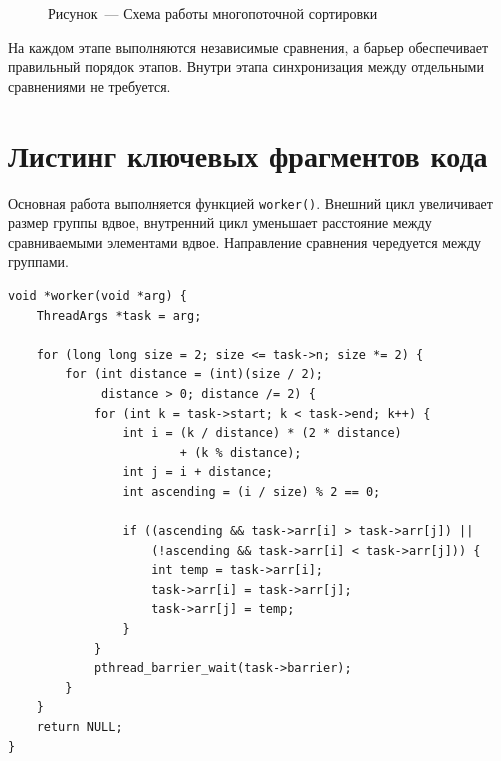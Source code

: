 \documentclass[12pt,a4paper]{article}
\begin{document}
\begin{figure}[H]
\centering
{}
\caption*{Рисунок~--- Схема работы многопоточной сортировки}
\end{figure}

На каждом этапе выполняются независимые сравнения, а барьер обеспечивает правильный порядок этапов. Внутри этапа синхронизация между отдельными сравнениями не требуется.

\Needspace{0.55\textheight}
\section{Листинг ключевых фрагментов кода}
Основная работа выполняется функцией \texttt{worker()}. Внешний цикл увеличивает размер группы вдвое, внутренний цикл уменьшает расстояние между сравниваемыми элементами вдвое. Направление сравнения чередуется между группами.

\begin{lstlisting}[style=cstyle,caption={Сравнение элементов в рабочем потоке}]
void *worker(void *arg) {
    ThreadArgs *task = arg;

    for (long long size = 2; size <= task->n; size *= 2) {
        for (int distance = (int)(size / 2);
             distance > 0; distance /= 2) {
            for (int k = task->start; k < task->end; k++) {
                int i = (k / distance) * (2 * distance)
                        + (k % distance);
                int j = i + distance;
                int ascending = (i / size) % 2 == 0;

                if ((ascending && task->arr[i] > task->arr[j]) ||
                    (!ascending && task->arr[i] < task->arr[j])) {
                    int temp = task->arr[i];
                    task->arr[i] = task->arr[j];
                    task->arr[j] = temp;
                }
            }
            pthread_barrier_wait(task->barrier);
        }
    }
    return NULL;
}
\end{lstlisting}
\end{document}
